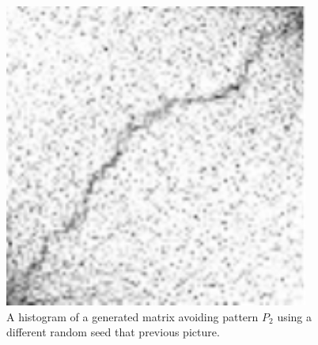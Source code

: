 \begin{figure}[h!]
\centering
\includegraphics[width=100mm]{../img/walker2.pdf}
\caption{A histogram of a generated matrix avoiding pattern $P_2$ using a different random seed that previous picture.}
\label{walker2}
\end{figure}